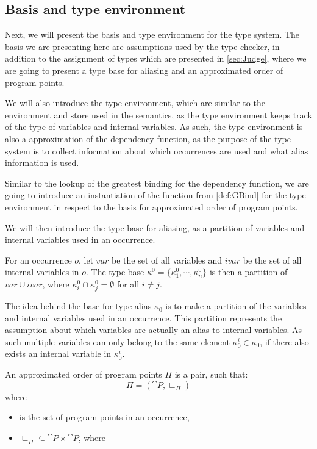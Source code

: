 \documentclass[acmsmall,sigplan]{acmart}
\begin{document}
\subsection{Basis and type environment}\label{sec:basis}
Next, we will present the basis and type environment for the type system.
The basis we are presenting here are assumptions used by the type checker, in addition to the assignment of types which are presented in \cref{sec:Judge}, where we are going to present a type base for aliasing and an approximated order of program points.

We will also introduce the type environment, which are similar to the environment and store used in the semantics, as the type environment keeps track of the type of variables and internal variables.
As such, the type environment is also a approximation of the dependency function, as the purpose of the type system is to collect information about which occurrences are used and what alias information is used.

Similar to the lookup of the greatest binding for the dependency function, we are going to introduce an instantiation of the function from \cref{def:GBind} for the type environment in respect to the basis for approximated order of program points.
\bigskip

We will then introduce the type base for aliasing, as a partition of variables and internal variables used in an occurrence.

\begin{definition}
	For an occurrence $o$, let $var$ be the set of all variables and $ivar$ be the set of all internal variables in $o$.
	The type base $\kappa^0=\{\kappa^0_1,\cdots,\kappa^0_n\}$ is then a partition of $var\cup ivar$, where $\kappa_i^0\cap\kappa_j^0=\emptyset$ for all $i\neq j$.
\end{definition}

The idea behind the base for type alias $\kappa_0$ is to make a partition of the variables and internal variables used in an occurrence.
This partition represents the assumption about which variables are actually an alias to internal variables.
As such multiple variables can only belong to the same element $\kappa_0^i\in\kappa_0$, if there also exists an internal variable in $\kappa_0^i$.

\begin{definition}
	An approximated order of program points $\Pi$ is a pair, such that: 
	$$\Pi=(\cat{P},\sqsubseteq_\Pi)$$
	where
	\begin{itemize}
		\item {} is the set of program points in an occurrence,
		\item $\sqsubseteq_\Pi\subseteq\cat{P}\times\cat{P}$, where
	\end{itemize}
\end{definition}
\end{document}
